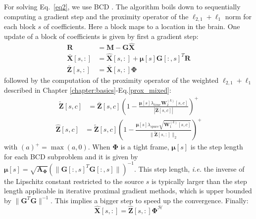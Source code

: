 For solving Eq.~\eqref{eq2}, we use BCD \cite{tseng2010approximation}. The algorithm boils down to sequentially computing a gradient step and the proximity operator of the $\ell_{2,1}+\ell_1$ norm for each block $s$ of coefficients. Here a block maps to a location in the brain. One update of a block of coefficients is given by first a gradient step:
\begin{align} \label{eq5}
    \mathbf{R} &= \mathbf{M} - \mathbf{G}\hat{\mathbf{X}} \\
    \bar{\mathbf{X}}[s,:] &= \hat{\mathbf{X}}[s,:] + \mathbf{\mu}[s]\mathbf{G}[:,s]^T\mathbf{R} \\
    \bar{\mathbf{Z}}[s,:] &= \bar{\mathbf{X}}[s,:]\mathbf{\Phi}
\end{align}
followed by the computation of the proximity operator of the weighted $\ell_{2,1}+\ell_1$ described in Chapter \ref{chapter:basics}-Eq.\ref{prox_mixed}:
\begin{equation} \label{prox_l1}
\begin{aligned}
    \tilde{\mathbf{Z}}[s,c] &= \bar{\mathbf{Z}}[s,c]\left(1 - \frac{\mathbf{\mu}[s]\lambda_{time}\mathbf{W}_2^{(k)}[s,c]}{|\bar{\mathbf{Z}}[s,c]|} \right)^+
\end{aligned}
\end{equation}
\begin{equation} \label{prox_l21}
\begin{aligned}
    \hat{\mathbf{Z}}[s,c] &= \tilde{\mathbf{Z}}[s,c]\left(1 - \frac{\mathbf{\mu}[s]\lambda_{space}\sqrt{\mathbf{W}_1^{(k)}[s,c]}}{\|\tilde{\mathbf{Z}}[s,:]\|_2}\right)^+
\end{aligned}
\end{equation}
with $(a)^+=\max(a,0)$. When $\mathbf{\Phi}$ is a tight frame, $\mathbf{\mu}[s]$ is the step length for each BCD subproblem and it is given by $\mathbf{\mu}[s]=\sqrt{\mathbf{A}_{\mathbf{\Phi}}}(\|\mathbf{G}[:,s]^T\mathbf{G}[:,s]\|)^{-1}$. This step length, \textit{i.e.} the inverse of the Lipschitz constant restricted to the source $s$ is typically larger than the step length applicable in iterative proximal gradient methods, which is upper bounded by $\|\mathbf{G}^T\mathbf{G}\|^{-1}$. This implies a bigger step to speed up the convergence.
Finally:
\begin{equation}
    \hat{\mathbf{X}}[s,:] = \hat{\mathbf{Z}}[s,:]\mathbf{\Phi}^\mathcal{H}
\end{equation}


